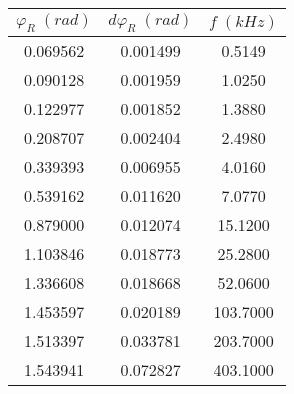 \begin{tabular}{cc|c}
\toprule
$\varphi_{R} \; (rad)$ & $d\varphi_{R} \; (rad)$ & $f \; (kHz)$ \\
\midrule
              0.069562 &                0.001499 &       0.5149 \\
              0.090128 &                0.001959 &       1.0250 \\
              0.122977 &                0.001852 &       1.3880 \\
              0.208707 &                0.002404 &       2.4980 \\
              0.339393 &                0.006955 &       4.0160 \\
              0.539162 &                0.011620 &       7.0770 \\
              0.879000 &                0.012074 &      15.1200 \\
              1.103846 &                0.018773 &      25.2800 \\
              1.336608 &                0.018668 &      52.0600 \\
              1.453597 &                0.020189 &     103.7000 \\
              1.513397 &                0.033781 &     203.7000 \\
              1.543941 &                0.072827 &     403.1000 \\
\bottomrule
\end{tabular}
